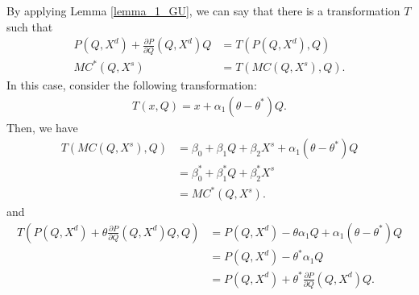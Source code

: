 \documentclass[11pt, a4paper]{article}
\theoremstyle{remark}
\begin{document}
By applying Lemma \ref{lemma_1_GU}, we can say that there is a transformation $T$ such that
\begin{align}
    P(Q, X^d) + \frac{\partial P}{\partial Q}(Q, X^d) Q & = T(P(Q, X^d), Q)\\
    MC^{*}(Q, X^s) &= T(MC(Q, X^s), Q).
\end{align}
In this case, consider the following transformation:
\begin{align}
    T(x, Q) = x + \alpha_1(\theta - \theta^{*})Q.
\end{align}
Then, we have
\begin{align}
    T(MC(Q, X^s), Q) & =  \beta_0 + \beta_1 Q + \beta_2 X^s + \alpha_1(\theta - \theta^{*})Q\\
    & = \beta_0^{*} + \beta_1^{*} Q + \beta_2^{*} X^s\\
    & = MC^{*}(Q, X^s).
\end{align}
and
\begin{align}
    T\left(P(Q, X^d) + \theta \frac{\partial P}{\partial Q}(Q, X^d) Q, Q\right) & = P(Q, X^d) -\theta \alpha_1 Q +  \alpha_1(\theta - \theta^{*})Q\\ 
    & = P(Q, X^d) - \theta^{*} \alpha_1 Q  \\
    & = P(Q, X^d) + \theta^{*} \frac{\partial P}{\partial Q}(Q, X^d) Q.
\end{align}
\end{document}
